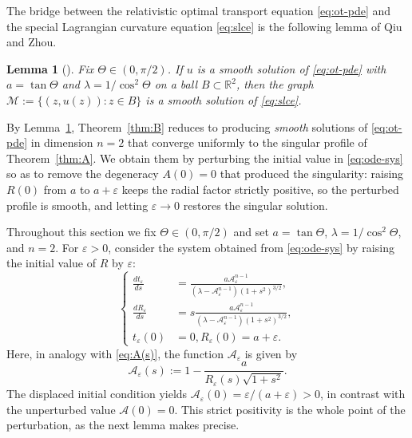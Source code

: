 \documentclass[12pt,letterpaper]{amsart}
\theoremstyle{definition}
\theoremstyle{plain}
\newtheorem{lemma}[definition]{Lemma}
\numberwithin{equation}{section}
\newcommand{\R}{\mathbb{R}}
\newcommand{\ve}{\varepsilon}
\begin{document}
The bridge between the relativistic optimal transport equation \eqref{eq:ot-pde} and the
special Lagrangian curvature equation \eqref{eq:slce} is the following lemma of Qiu and Zhou.

\begin{lemma}[{\cite[Lemma~6.1]{QZ26}}]\label{lem:ot-slce}
    Fix $\Theta\in(0,\pi/2)$. If $u$ is a smooth solution of \eqref{eq:ot-pde} with
    $a=\tan\Theta$ and $\lambda=1/\cos^2\Theta$ on a ball $B\subset\R^2$, then the graph
    $\mathcal{M}:=\{(z,u(z)):z\in B\}$ is a smooth solution of \eqref{eq:slce}.
\end{lemma}

By Lemma~\ref{lem:ot-slce}, Theorem~\ref{thm:B} reduces to producing \emph{smooth} solutions of
\eqref{eq:ot-pde} in dimension $n=2$ that converge uniformly to the singular profile of
Theorem~\ref{thm:A}. We obtain them by perturbing the initial value in \eqref{eq:ode-sys} so as
to remove the degeneracy $A(0)=0$ that produced the singularity: raising $R(0)$ from $a$ to
$a+\varepsilon$ keeps the radial factor strictly positive, so the perturbed profile is smooth,
and letting $\varepsilon\to0$ restores the singular solution.

Throughout this section we fix $\Theta\in(0,\pi/2)$ and set $a=\tan\Theta$,
$\lambda=1/\cos^2\Theta$, and $n=2$. For $\varepsilon>0$, consider the system obtained from
\eqref{eq:ode-sys} by raising the initial value of $R$ by $\varepsilon$:
 \begin{equation}\label{eq:sys-ve}
    \left\{
        \begin{aligned}
            \frac{dt_\ve}{ds}&=\frac{a\mathcal{A}_\ve^{n-1}}{(\lambda-\mathcal{A}_\ve^{n-1})(1+s^2)^{3/2}},\\
            \frac{dR_\ve}{ds}&=s\frac{a\mathcal{A}_\ve^{n-1}}{(\lambda-\mathcal{A}_\ve^{n-1})(1+s^2)^{3/2}},\\
            t_\ve(0)&=0,R_\ve(0)=a+\ve.
        \end{aligned}
    \right.
\end{equation}
Here, in analogy with \eqref{eq:A(s)}, the function $\mathcal{A}_\ve$ is given by
\begin{equation}\label{eq:A-ve-s}
    \mathcal{A}_\ve(s):=1-\frac{a}{R_\ve(s)\sqrt{1+s^2}}.
\end{equation}
The displaced initial condition yields $\mathcal{A}_\ve(0)=\varepsilon/(a+\varepsilon)>0$, in
contrast with the unperturbed value $\mathcal{A}(0)=0$.
This strict positivity is the whole
point of the perturbation, as the next lemma makes precise.
\end{document}
